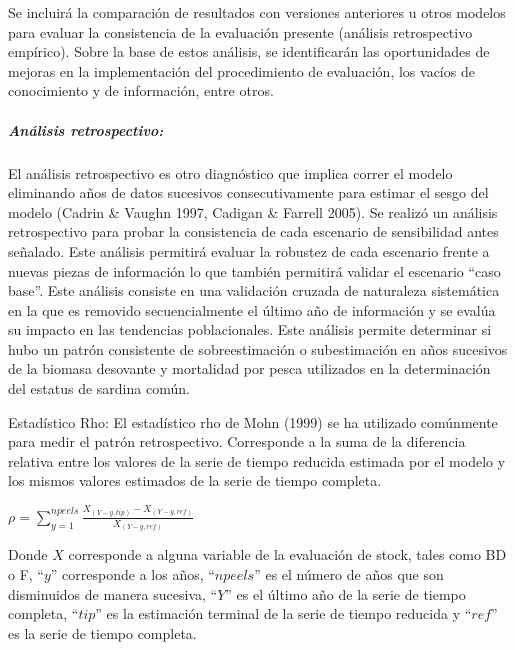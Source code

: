 \documentclass[
  spanish,
]{article}
\begin{document}
Se incluirá la comparación de resultados con versiones anteriores u
otros modelos para evaluar la consistencia de la evaluación presente
(análisis retrospectivo empírico). Sobre la base de estos análisis, se
identificarán las oportunidades de mejoras en la implementación del
procedimiento de evaluación, los vacíos de conocimiento y de
información, entre otros.

\hypertarget{anuxe1lisis-retrospectivo}{%
\subparagraph{Análisis retrospectivo:}\label{anuxe1lisis-retrospectivo}}

El análisis retrospectivo es otro diagnóstico que implica correr el
modelo eliminando años de datos sucesivos consecutivamente para estimar
el sesgo del modelo (Cadrin \& Vaughn 1997, Cadigan \& Farrell 2005). Se
realizó un análisis retrospectivo para probar la consistencia de cada
escenario de sensibilidad antes señalado. Este análisis permitirá
evaluar la robustez de cada escenario frente a nuevas piezas de
información lo que también permitirá validar el escenario ``caso base''.
Este análisis consiste en una validación cruzada de naturaleza
sistemática en la que es removido secuencialmente el último año de
información y se evalúa su impacto en las tendencias poblacionales. Este
análisis permite determinar si hubo un patrón consistente de
sobreestimación o subestimación en años sucesivos de la biomasa
desovante y mortalidad por pesca utilizados en la determinación del
estatus de sardina común.

Estadístico Rho: El estadístico rho de Mohn (1999) se ha utilizado
comúnmente para medir el patrón retrospectivo. Corresponde a la suma de
la diferencia relativa entre los valores de la serie de tiempo reducida
estimada por el modelo y los mismos valores estimados de la serie de
tiempo completa.

\vspace{0.5cm}
\Large
\begin{center} 
$\rho=\sum_{y=1}^{npeels}\frac{X_{(Y-y,tip)}-X_{(Y-y,ref)}}{X_{(Y-y,ref)}}$ 
\end{center}
\vspace{0.5cm}

\normalsize

Donde \(X\) corresponde a alguna variable de la evaluación de stock,
tales como BD o F, ``\(y\)'' corresponde a los años, ``\(npeels\)'' es
el número de años que son disminuidos de manera sucesiva, ``\(Y\)'' es
el último año de la serie de tiempo completa, ``\(tip\)'' es la
estimación terminal de la serie de tiempo reducida y ``\(ref\)'' es la
serie de tiempo completa.
\end{document}
